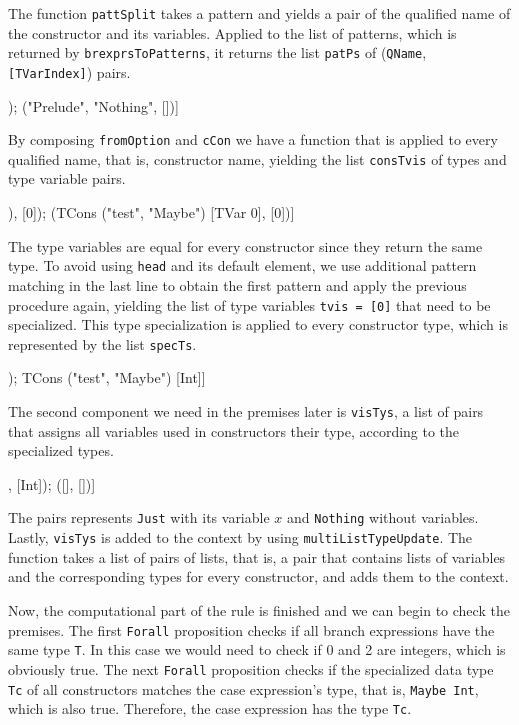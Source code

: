 \documentclass[paper = a4, fleqn, twoside]{scrreprt}
\newcommand{\coqinline}[1]{\texttt{#1}}
\begin{document}
The function \coqinline{pattSplit} takes a pattern and yields a pair of the qualified name of the constructor and its variables. Applied to the list of patterns, which is returned by \coqinline{brexprsToPatterns}, it returns the list \texttt{patPs} of (\coqinline{QName}, \coqinline{[TVarIndex]}) pairs.
\begin{coqcode}
[("Prelude", "Just", [3]); ("Prelude", "Nothing", [])]
\end{coqcode}
By composing \coqinline{fromOption} and \coqinline{cCon} we have a function that is applied to every qualified name, that is, constructor name, yielding the list \texttt{consTvis} of types and type variable pairs.
\begin{coqcode}
[(FuncType (TVar 0) (TCons ("test", "Maybe") [TVar 0]), [0]);
                    (TCons ("test", "Maybe") [TVar 0],  [0])]
\end{coqcode}
The type variables are equal for every constructor since they return the same type. To avoid using \texttt{head} and its default element, we use additional pattern matching in the last line to obtain the first pattern and apply the previous procedure again, yielding the list of type variables \texttt{tvis = [0]} that need to be specialized. This type specialization is applied to every constructor type, which is represented by the list \texttt{specTs}.
\begin{coqcode}
[FuncType Int (TCons ("test", "Maybe") [Int]);
               TCons ("test", "Maybe") [Int]]
\end{coqcode}
The second component we need in the premises later is \texttt{visTys}, a list of pairs that assigns all variables used in constructors their type, according to the specialized types.
\begin{coqcode}
[([3], [Int]); ([], [])]
\end{coqcode}
The pairs represents \texttt{Just} with its variable $x$ and \texttt{Nothing} without variables.
Lastly, \texttt{visTys} is added to the context by using \coqinline{multiListTypeUpdate}. The function takes a list of pairs of lists, that is, a pair that contains lists of variables and the corresponding types for every constructor, and adds them to the context.
\par
Now, the computational part of the rule is finished and we can begin to check the premises. The first \texttt{Forall} proposition checks if all branch expressions have the same type \texttt{T}. In this case we would need to check if 0 and 2 are integers, which is obviously true. The next \texttt{Forall} proposition checks if the specialized data type \texttt{Tc} of all constructors matches the case expression's type, that is, \texttt{Maybe Int}, which is also true. Therefore, the case expression has the type \texttt{Tc}.
\end{document}
